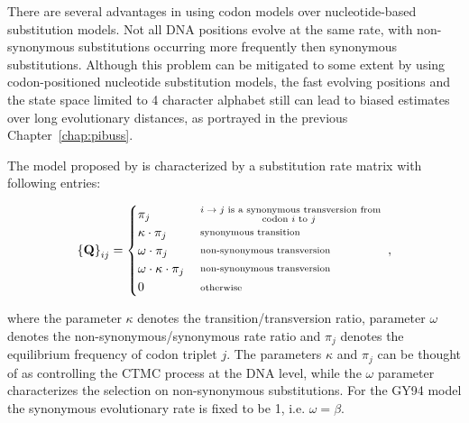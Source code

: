 There are several advantages in using codon models over nucleotide-based substitution models.
Not all DNA positions evolve at the same rate, with non-synonymous substitutions occurring more frequently then synonymous substitutions.
Although this problem can be mitigated to some extent by using codon-positioned nucleotide substitution models, the fast evolving positions and the state space limited to 4 character alphabet still can lead to biased estimates over long evolutionary distances, as portrayed in the previous Chapter~\ref{chap:pibuss}.

The model proposed by \cite{Goldman1994} is characterized by a substitution rate matrix with following entries:

\begin{equation}
\left\{ \mathbf{Q}\right\} _{ij}=\begin{cases}
\pi_{j} & \substack{ \text{ \ensuremath{i\rightarrow j} is a synonymous transversion from } \\ \text{codon \ensuremath{i} to \ensuremath{j} } } \\  
\kappa\cdot\pi_{j} & \substack{ \text{ synonymous transition } } \\
\omega\cdot\pi_{j} & \substack{ \text{ non-synonymous transversion } } \\
\omega\cdot\kappa\cdot\pi_{j} & \substack{ \text{ non-synonymous transversion } } \\
0 & \substack{ \text{ otherwise} }
\end{cases},
\label{eq:gy94}
\end{equation}

\noindent
where the parameter $\kappa$ denotes the transition/transversion ratio, parameter $\omega$ denotes the non-synonymous/synonymous
rate ratio and $\pi_j$ denotes the equilibrium frequency of codon triplet $j$.
The parameters $\kappa$ and $\pi_j$ can be thought of as controlling the CTMC process at the DNA level, while the $\omega$ parameter characterizes the selection on non-synonymous substitutions.
For the GY94 model the synonymous evolutionary rate is fixed to be 1, i.e. $\omega=\beta$.

